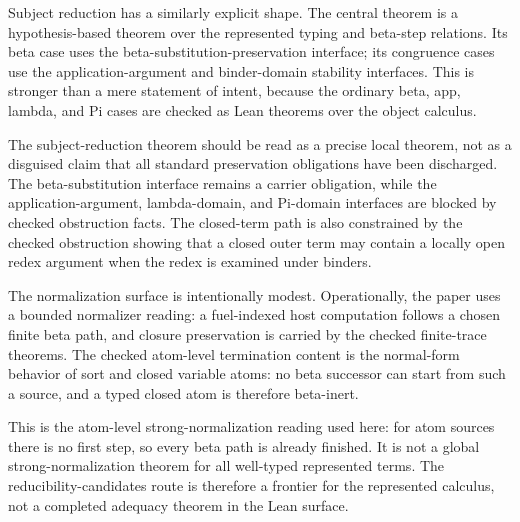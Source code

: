 Subject reduction has a similarly explicit shape.  The central theorem is a
hypothesis-based theorem over the represented typing and beta-step relations.
Its beta case uses the beta-substitution-preservation interface; its
congruence cases use the application-argument and binder-domain stability
interfaces.  This is stronger than a mere statement of intent, because the
ordinary beta, app, lambda, and Pi cases are checked as Lean theorems over the
object calculus.


The subject-reduction theorem should be read as a precise local theorem, not
as a disguised claim that all standard preservation obligations have been
discharged.  The beta-substitution interface remains a carrier obligation,
while the application-argument, lambda-domain, and Pi-domain interfaces are
blocked by checked obstruction facts.  The
closed-term path is also constrained by the checked obstruction showing that a
closed outer term may contain a locally open redex argument when the redex is
examined under binders.


The normalization surface is intentionally modest.  Operationally, the paper
uses a bounded normalizer reading: a fuel-indexed host computation follows a
chosen finite beta path, and closure preservation is carried by the checked
finite-trace theorems.  The checked atom-level termination content is the
normal-form behavior of sort and closed variable atoms: no beta successor can
start from such a source, and a typed closed atom is therefore beta-inert.


This is the atom-level strong-normalization reading used here: for atom
sources there is no first step, so every beta path is already finished.  It is
not a global strong-normalization theorem for all well-typed represented terms.
The reducibility-candidates route is therefore a frontier for the represented
calculus, not a completed adequacy theorem in the Lean surface.

